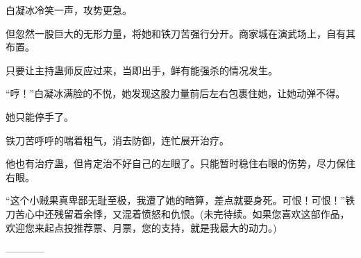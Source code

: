 \begin{this_body}
白凝冰冷笑一声，攻势更急。

但忽然一股巨大的无形力量，将她和铁刀苦强行分开。商家城在演武场上，自有其布置。

只要让主持蛊师反应过来，当即出手，鲜有能强杀的情况发生。

“哼！”白凝冰满脸的不悦，她发现这股力量前后左右包裹住她，让她动弹不得。

她只能停手了。

铁刀苦呼呼的喘着粗气，消去防御，连忙展开治疗。

他也有治疗蛊，但肯定治不好自己的左眼了。只能暂时稳住右眼的伤势，尽力保住右眼。

“这个小贼果真卑鄙无耻至极，我遭了她的暗算，差点就要身死。可恨！可恨！”铁刀苦心中还残留着余悸，又混着愤怒和仇恨。(未完待续。如果您喜欢这部作品，欢迎您来起点投推荐票、月票，您的支持，就是我最大的动力。)

------------

\end{this_body}

